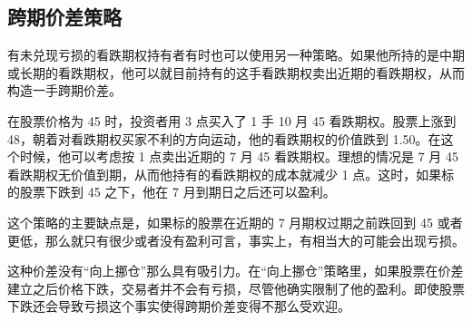 \subsection{跨期价差策略}
有未兑现亏损的看跌期权持有者有时也可以使用另一种策略。如果他所持的是中期或长期的看跌期权，他可以就目前持有的这手看跌期权卖出近期的看跌期权，从而构造一手跨期价差。
\begin{tcolorbox}
    在股票价格为 45 时，投资者用 3 点买入了 1 手 10 月 45 看跌期权。股票上涨到 48，朝着对看跌期权买家不利的方向运动，他的看跌期权的价值跌到 1.50。在这个时候，他可以考虑按 1 点卖出近期的 7 月 45 看跌期权。理想的情况是 7 月 45 看跌期权无价值到期，从而他持有的看跌期权的成本就减少 1 点。这时，如果标的股票下跌到 45 之下，他在 7 月到期日之后还可以盈利。
\end{tcolorbox}

这个策略的主要缺点是，如果标的股票在近期的 7 月期权过期之前跌回到 45 或者更低，那么就只有很少或者没有盈利可言，事实上，有相当大的可能会出现亏损。

这种价差没有“向上挪仓”那么具有吸引力。在“向上挪仓”策略里，如果股票在价差建立之后价格下跌，交易者并不会有亏损，尽管他确实限制了他的盈利。即使股票下跌还会导致亏损这个事实使得跨期价差变得不那么受欢迎。